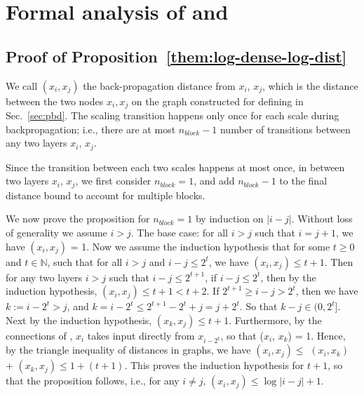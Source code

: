 
\section{Formal analysis of \logdense and \loglogdense}


\subsection{Proof of Proposition~\ref{them:log-dense-log-dist}}
\label{sec:logdense_proof}
\begin{myproof}
We call \bd$(x_i, x_j)$ the back-propagation distance from $x_i$, $x_j$, which is the distance between the two 
nodes $x_i, x_j$ on the graph constructed for defining \pbd in Sec.~\ref{sec:pbd}.
The scaling transition happens only once for each scale during backpropagation; i.e., there 
are at most $n_{block}-1$ number of transitions between any two layers $x_i$, $x_j$.  

Since the transition between each two scales happens at most once, in between two layers $x_i$, $x_j$, we first consider $n_{block}=1$, and add $n_{block}-1$ to the final distance bound to account for multiple blocks. 

We now prove the proposition for $n_{block}=1$ by induction on $|i-j|$. 
Without loss of generality we assume $i>j$. 
The base case: for all $i> j$ such that $i = j+1$, we have \bd$(x_i, x_j)$ = 1.
Now we assume the induction hypothesis that for some $t \geq 0$ and $t\in \mathbb{N}$, such that 
for all $i >j$ and $i - j \leq 2^t$, we have \bd$(x_i, x_j) \leq t +1$.  
Then for any two layers $i >j$ such that $i -j \leq 2^{t+1}$, if 
$i - j \leq 2^t$, then by the induction hypothesis, \bd$(x_i, x_j) \leq t +1 < t+2$.
If $2^{t+1} \geq i - j > 2^t$, then 
we have $k := i - 2^t > j$, and $k= i - 2^t \leq 2^{t+1} -2^t + j = j+ 2^t$. So that 
$k - j \in (0, 2^t]$. Next by the induction hypothesis, 
\bd$(x_k, x_j) \leq t+1$. 
Furthermore, by the connections of \logdense, $x_i$ takes input directly from 
$x_{i-2^t}$, so that \bd($x_i$, $x_k$) = 1. Hence, by the triangle inequality of 
distances in graphs, we have \bd$(x_i, x_j) \leq$ \bd$(x_i, x_k)$ + \bd$(x_k, x_j) \leq 1 + (t+1)$. 
This proves the induction hypothesis for $t+1$, so that the proposition follows, i.e., 
for any $i \neq j$, \bd$(x_i, x_j) \leq \log |i-j| + 1$. 

\end{myproof}

